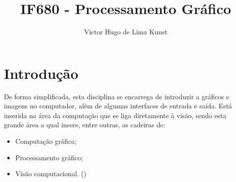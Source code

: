\documentclass[a4paper]{article}
\title{IF680 - Processamento Gráfico}
\author{Victor Hugo de Lima Kunst}
\begin{document}
\maketitle
\section*{Introdução}
De forma simplificada, esta disciplina se encarrega de introduzir a gráficos e imagens no computador, além de algumas interfaces de entrada e saída.
\linebreak
Está inserida na área da computação que se liga diretamente à visão, sendo esta grande área a qual insere, entre outras, as cadeiras de:
\begin{itemize}
\item Computação gráfica;
\item Processamento gráfico;
\item Visão computacional.
(\cite{sitePet})
\end{itemize}
\end{document}
